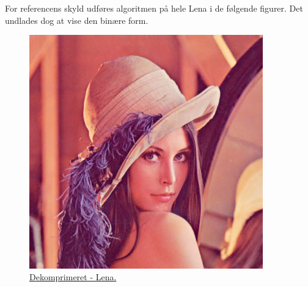 For referencens skyld udføres algoritmen på hele Lena i de følgende figurer. Det undlades dog at vise den binære form.
\begin{figure}[htbp]
\begin{minipage}{0.3\textwidth}
\centering
\includegraphics[width=0.9\textwidth]{Billeder/LenaAnvendelse/LENABILLEDE/lena5-compressed.png}
\caption{\href{https://www.dropbox.com/home/P1\%20-\%20B205/vejleder/billeder/DCT/Lena\%20ved\%20forskelige\%20Q?preview=lenaQ50.png}{Dekomprimeret - Lena.}}
\label{fig:lena5-decompressed-visuel}
\end{minipage}
\hspace{0.5cm}
\begin{minipage}{0.3\textwidth}
\centering

\end{minipage}
\end{figure}
